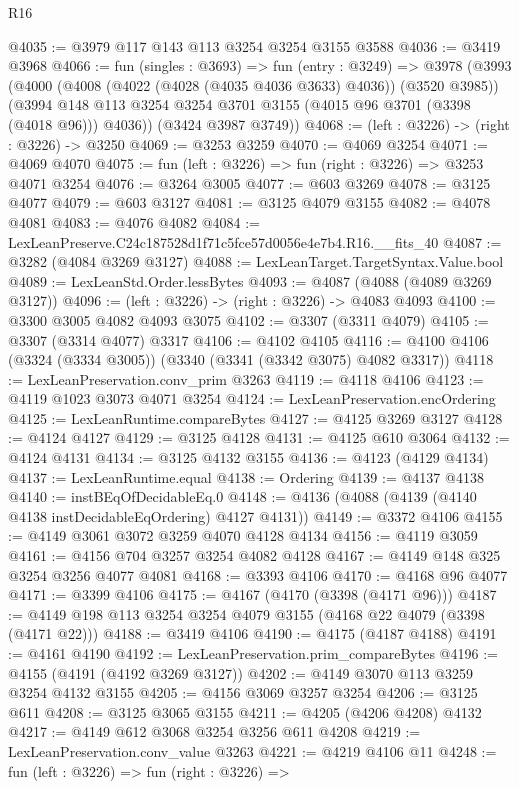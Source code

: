 \begin{lexlean}{R16}
\begin{coremodule}
@4035 := @3979 @117 @143 @113 @3254 @3254 @3155 @3588
@4036 := @3419 @3968
@4066 := fun (singles : @3693) =>
  fun (entry : @3249) =>
  @3978
    (@3993
      (@4000
        (@4008 (@4022 (@4028 (@4035 @4036 @3633) @4036)) (@3520 @3985))
        (@3994 @148 @113 @3254 @3254 @3701 @3155 (@4015 @96 @3701 (@3398 (@4018 @96))) @4036))
      (@3424 @3987 @3749))
@4068 := (left : @3226) -> (right : @3226) -> @3250
@4069 := @3253 @3259
@4070 := @4069 @3254
@4071 := @4069 @4070
@4075 := fun (left : @3226) => fun (right : @3226) => @3253 @4071 @3254
@4076 := @3264 @3005
@4077 := @603 @3269
@4078 := @3125 @4077
@4079 := @603 @3127
@4081 := @3125 @4079 @3155
@4082 := @4078 @4081
@4083 := @4076 @4082
@4084 := LexLeanPreserve.C24c187528d1f71c5fce57d0056e4e7b4.R16.__fits_40
@4087 := @3282 (@4084 @3269 @3127)
@4088 := LexLeanTarget.TargetSyntax.Value.bool
@4089 := LexLeanStd.Order.lessBytes
@4093 := @4087 (@4088 (@4089 @3269 @3127))
@4096 := (left : @3226) -> (right : @3226) -> @4083 @4093
@4100 := @3300 @3005 @4082 @4093 @3075
@4102 := @3307 (@3311 @4079)
@4105 := @3307 (@3314 @4077) @3317
@4106 := @4102 @4105
@4116 := @4100 @4106 (@3324 (@3334 @3005)) (@3340 (@3341 (@3342 @3075) @4082 @3317))
@4118 := LexLeanPreservation.conv_prim @3263
@4119 := @4118 @4106
@4123 := @4119 @1023 @3073 @4071 @3254
@4124 := LexLeanPreservation.encOrdering
@4125 := LexLeanRuntime.compareBytes
@4127 := @4125 @3269 @3127
@4128 := @4124 @4127
@4129 := @3125 @4128
@4131 := @4125 @610 @3064
@4132 := @4124 @4131
@4134 := @3125 @4132 @3155
@4136 := @4123 (@4129 @4134)
@4137 := LexLeanRuntime.equal
@4138 := Ordering
@4139 := @4137 @4138
@4140 := instBEqOfDecidableEq.{0}
@4148 := @4136 (@4088 (@4139 (@4140 @4138 instDecidableEqOrdering) @4127 @4131))
@4149 := @3372 @4106
@4155 := @4149 @3061 @3072 @3259 @4070 @4128 @4134
@4156 := @4119 @3059
@4161 := @4156 @704 @3257 @3254 @4082 @4128
@4167 := @4149 @148 @325 @3254 @3256 @4077 @4081
@4168 := @3393 @4106
@4170 := @4168 @96 @4077
@4171 := @3399 @4106
@4175 := @4167 (@4170 (@3398 (@4171 @96)))
@4187 := @4149 @198 @113 @3254 @3254 @4079 @3155 (@4168 @22 @4079 (@3398 (@4171 @22)))
@4188 := @3419 @4106
@4190 := @4175 (@4187 @4188)
@4191 := @4161 @4190
@4192 := LexLeanPreservation.prim_compareBytes
@4196 := @4155 (@4191 (@4192 @3269 @3127))
@4202 := @4149 @3070 @113 @3259 @3254 @4132 @3155
@4205 := @4156 @3069 @3257 @3254
@4206 := @3125 @611
@4208 := @3125 @3065 @3155
@4211 := @4205 (@4206 @4208) @4132
@4217 := @4149 @612 @3068 @3254 @3256 @611 @4208
@4219 := LexLeanPreservation.conv_value @3263
@4221 := @4219 @4106 @11
@4248 := fun (left : @3226) =>
  fun (right : @3226) =>

\end{coremodule}
\end{lexlean}
